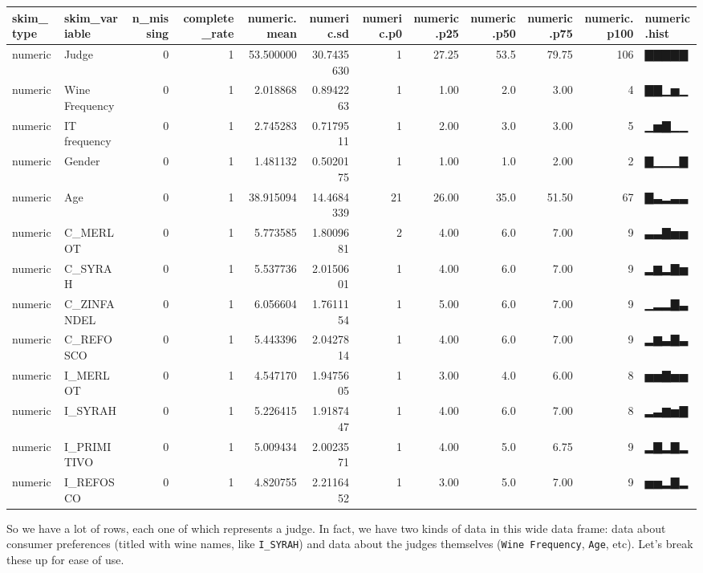\documentclass[
]{book}
\begin{document}
\begin{tabular}{l|l|r|r|r|r|r|r|r|r|r|l}
\hline
skim\_type & skim\_variable & n\_missing & complete\_rate & numeric.mean & numeric.sd & numeric.p0 & numeric.p25 & numeric.p50 & numeric.p75 & numeric.p100 & numeric.hist\\
\hline
numeric & Judge & 0 & 1 & 53.500000 & 30.7435630 & 1 & 27.25 & 53.5 & 79.75 & 106 & ▇▇▇▇▇\\
\hline
numeric & Wine Frequency & 0 & 1 & 2.018868 & 0.8942263 & 1 & 1.00 & 2.0 & 3.00 & 4 & ▇▇▁▅▁\\
\hline
numeric & IT frequency & 0 & 1 & 2.745283 & 0.7179511 & 1 & 2.00 & 3.0 & 3.00 & 5 & ▁▅▇▁▁\\
\hline
numeric & Gender & 0 & 1 & 1.481132 & 0.5020175 & 1 & 1.00 & 1.0 & 2.00 & 2 & ▇▁▁▁▇\\
\hline
numeric & Age & 0 & 1 & 38.915094 & 14.4684339 & 21 & 26.00 & 35.0 & 51.50 & 67 & ▇▃▂▃▃\\
\hline
numeric & C\_MERLOT & 0 & 1 & 5.773585 & 1.8009681 & 2 & 4.00 & 6.0 & 7.00 & 9 & ▃▃▇▅▅\\
\hline
numeric & C\_SYRAH & 0 & 1 & 5.537736 & 2.0150601 & 1 & 4.00 & 6.0 & 7.00 & 9 & ▂▆▂▇▅\\
\hline
numeric & C\_ZINFANDEL & 0 & 1 & 6.056604 & 1.7611154 & 1 & 5.00 & 6.0 & 7.00 & 9 & ▁▂▂▇▃\\
\hline
numeric & C\_REFOSCO & 0 & 1 & 5.443396 & 2.0427814 & 1 & 4.00 & 6.0 & 7.00 & 9 & ▂▆▃▇▃\\
\hline
numeric & I\_MERLOT & 0 & 1 & 4.547170 & 1.9475605 & 1 & 3.00 & 4.0 & 6.00 & 8 & ▅▅▇▅▅\\
\hline
numeric & I\_SYRAH & 0 & 1 & 5.226415 & 1.9187447 & 1 & 4.00 & 6.0 & 7.00 & 8 & ▂▃▆▅▇\\
\hline
numeric & I\_PRIMITIVO & 0 & 1 & 5.009434 & 2.0023571 & 1 & 4.00 & 5.0 & 6.75 & 9 & ▂▇▂▇▂\\
\hline
numeric & I\_REFOSCO & 0 & 1 & 4.820755 & 2.2116452 & 1 & 3.00 & 5.0 & 7.00 & 9 & ▅▅▂▇▂\\
\hline
\end{tabular}

So we have a lot of rows, each one of which represents a judge. In fact, we have two kinds of data in this wide data frame: data about consumer preferences (titled with wine names, like \texttt{I\_SYRAH}) and data about the judges themselves (\texttt{Wine\ Frequency}, \texttt{Age}, etc). Let's break these up for ease of use.
\end{document}
